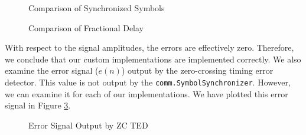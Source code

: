 \documentclass{article}
\begin{document}
\begin{figure}[H]
	\centerline{}
	\caption{Comparison of Synchronized Symbols}
	\label{fig::symbol_sync_error}
\end{figure}

\begin{figure}[H]
	\centerline{}
	\caption{Comparison of Fractional Delay}
	\label{fig::fractional_delay_error}
\end{figure}

\noindent With respect to the signal amplitudes, the errors are effectively zero. Therefore, we conclude that our custom implementations are implemented correctly. We also examine the error signal ($e(n)$) output by the zero-crossing timing error detector. This value is not output by the \texttt{comm.SymbolSynchronizer}. However, we can examine it for each of our implementations.  We have plotted this error signal in Figure \ref{fig::timing_offset}. 

\begin{figure}[H]
	\centerline{}
	\caption{Error Signal Output by ZC TED}
	\label{fig::timing_offset}
\end{figure}
\end{document}

